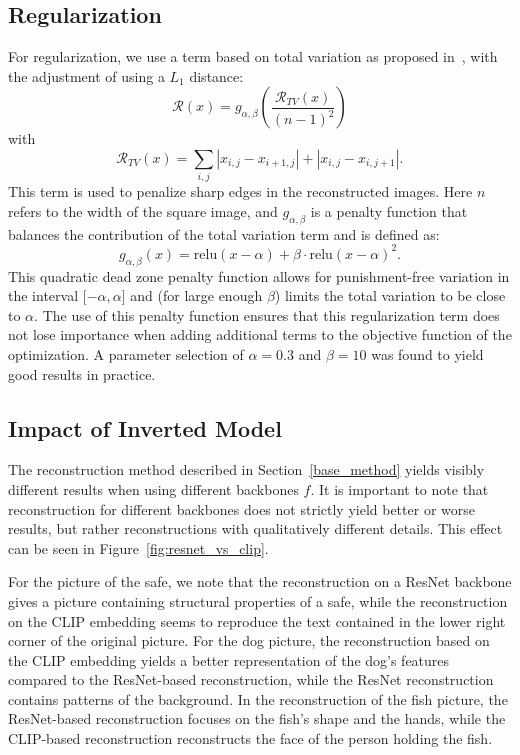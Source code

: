 \documentclass[10pt,twocolumn]{article}
\begin{document}
\subsection{Regularization}\label{reg}
For regularization, we use a term based on total variation as proposed in~\cite{mahendranUnderstandingDeepImage2015}, with the adjustment of using a $L_1$ distance:
$$
\mathcal{R}(x) = g_{\alpha,\beta}\left(\dfrac{\mathcal{R}_{TV}(x)}{(n-1)^2}\right)
$$
with
$$
\mathcal{R}_{TV}(x) = \sum_{i,j} \left| x_{i,j} - x_{i + 1,j} \right| + \left| x_{i,j} - x_{i,j + 1} \right|.
$$
This term is used to penalize sharp edges in the reconstructed images.
Here $n$ refers to the width of the square image, and $g_{\alpha,\beta}$ is a penalty function that balances the contribution of the total variation term and is defined as:
$$
g_{\alpha,\beta}(x) = \text{relu}(x - \alpha) + \beta\cdot\text{relu}(x - \alpha) ^ 2.
$$
This quadratic dead zone penalty function allows for punishment-free variation in the interval $\lbrack-\alpha,\alpha\rbrack$ and (for large enough $\beta$) limits the total variation to be close to $\alpha$.
The use of this penalty function ensures that this regularization term does not lose importance when adding additional terms to the objective function of the optimization.
A parameter selection of $\alpha = 0.3$ and $\beta = 10$ was found to yield good results in practice.

\subsection{Impact of Inverted Model}
The reconstruction method described in Section~\ref{base_method} yields visibly different results when using different backbones $f$.
It is important to note that reconstruction for different backbones does not strictly yield better or worse results, but rather reconstructions with qualitatively different details.
This effect can be seen in Figure~\ref{fig:resnet_vs_clip}.

For the picture of the safe, we note that the reconstruction on a ResNet backbone gives a picture containing structural properties of a safe, while the reconstruction on the CLIP embedding seems to reproduce the text contained in the lower right corner of the original picture.
For the dog picture, the reconstruction based on the CLIP embedding yields a better representation of the dog's features compared to the ResNet-based reconstruction, while the ResNet reconstruction contains patterns of the background.
In the reconstruction of the fish picture, the ResNet-based reconstruction focuses on the fish's shape and the hands, while the CLIP-based reconstruction reconstructs the face of the person holding the fish.
\end{document}
